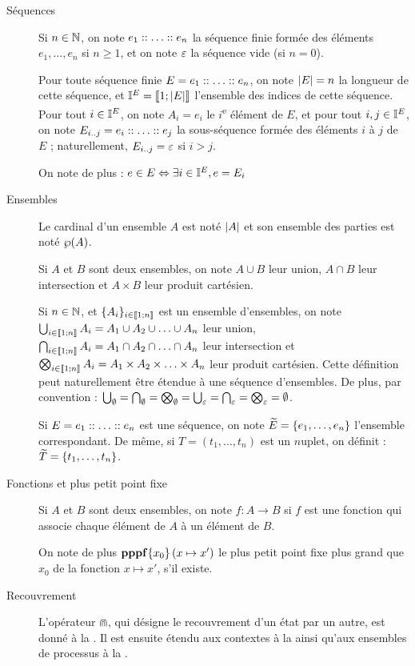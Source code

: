 \begin{description}
  \item[Séquences]
    Si $n \in \mathbb{N}$, on note $e_1 :: \ldots :: e_n$ la séquence finie formée
    des éléments $e_1, \ldots, e_n$ si $n \geq 1$,
    et on note $\varepsilon$ la séquence vide (si $n = 0$).
    
    Pour toute séquence finie $E = e_1 :: \ldots :: e_n$,
    on note $|E| = n$ la longueur de cette séquence,
    et $\mathbb{I}^{E} = \mathopen{\llbracket}1\mathclose{};|E|\mathclose{\rrbracket}$ l'ensemble des indices de cette séquence.
    Pour tout $i \in \mathbb{I}^{E}$, on note $A_i = e_i$ le $i$\textsuperscript{e} élément de $E$,
    et pour tout $i,j \in \mathbb{I}^{E}$, on note $E_{i..j} = e_i :: \ldots :: e_j$
    la sous-séquence formée des éléments $i$ à $j$ de $E$ ;
    naturellement, $E_{i..j} = \varepsilon$ si $i > j$.
    
    On note de plus : $e \in E \Leftrightarrow \exists i \in \mathbb{I}^{E}, e = E_i$
  
  \item[Ensembles]
    Le cardinal d'un ensemble $A$ est noté $|A|$
    et son ensemble des parties est noté $\wp(A)$.
    
    Si $A$ et $B$ sont deux ensembles, on note
    $A \cup B$ leur union, $A \cap B$ leur intersection et $A \times B$ leur produit cartésien.
    
    Si $n \in \mathbb{N}$, et $\{ A_i \}_{i \in \mathopen{\llbracket}1\mathclose{};n\mathclose{\rrbracket}}$ est un ensemble d'ensembles, on note
    $\bigcup_{i \in \mathopen{\llbracket}1\mathclose{};n\mathclose{\rrbracket}} A_i = A_1 \cup A_2 \cup \ldots \cup A_n$ leur union,
    $\bigcap_{i \in \mathopen{\llbracket}1\mathclose{};n\mathclose{\rrbracket}} A_i = A_1 \cap A_2 \cap \ldots \cap A_n$ leur intersection et
    $\bigotimes_{i \in \mathopen{\llbracket}1\mathclose{};n\mathclose{\rrbracket}} A_i = A_1 \times A_2 \times \ldots \times A_n$
    leur produit cartésien.
    Cette définition peut naturellement être étendue à une séquence d'ensembles.
    De plus, par convention :
    $\bigcup_{\emptyset} = \bigcap_{\emptyset} = \bigotimes_{\emptyset} =
      \bigcup_{\varepsilon} = \bigcap_{\varepsilon} = \bigotimes_{\varepsilon} = \emptyset$.
    
    Si $E = e_1 :: \ldots :: e_n$ est une séquence,
    on note $\widetilde{E} = \{ e_1, \ldots, e_n \}$ l'ensemble correspondant.
    De même, si $T = (t_1, \ldots, t_n)$ est un $n$\nbd uplet,
    on définit : $\widetilde{T} = \{ t_1, \ldots, t_n \}$.
  
  \item[Fonctions et plus petit point fixe]
    Si $A$ et $B$ sont deux ensembles,
    on note $f : A \rightarrow B$
    si $f$ est une fonction qui associe chaque élément de $A$ à un élément de $B$.
    
    On note de plus $\mathbf{pppf}\{x_0\}\left(x\mapsto x'\right)$ le plus petit point fixe plus grand que $x_0$
    de la fonction $x \mapsto x'$, s'il existe.
  
  \item[Recouvrement]
    L'opérateur $\Cap$, qui désigne le recouvrement d'un état par un autre,
    est donné à la .
    Il est ensuite étendu
    aux contextes à la 
    ainsi qu'aux ensembles de processus à la .

\end{description}

